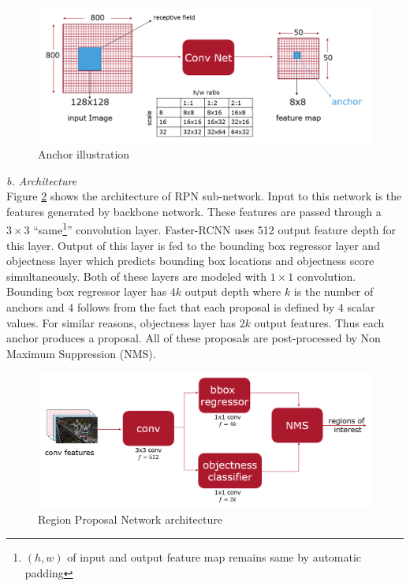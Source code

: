 \begin{figure}
    \centering
    \includegraphics[width=\linewidth]{images/anchors.PNG}
    \caption[Anchor illustration]{Anchor illustration}
    \label{fig:anchors}
\end{figure}

\vspace{5pt}
\textit{b. Architecture}\\
Figure \ref{fig:RPN-architecture} shows the architecture of RPN sub-network. Input to this network is the features generated by backbone network. These features are passed through a $3\times3$ ``same\footnote{$(h,w)$ of input and output feature map remains same by automatic padding}'' convolution layer. Faster-RCNN uses 512 output feature depth for this layer. Output of this layer is fed to the bounding box regressor layer and objectness layer which predicts bounding box locations and objectness score simultaneously.
Both of these layers are modeled with $1\times1$ convolution. Bounding box regressor layer has $4k$ output depth where $k$ is the number of anchors and 4 follows from the fact that each proposal is defined by 4 scalar values. For similar reasons, objectness layer has $2k$ output features. Thus each anchor produces a proposal. All of these proposals are post-processed by Non Maximum Suppression (NMS). 


\begin{figure}
    \centering
    \includegraphics[width=\linewidth]{images/RPN-architecture.PNG}
    \caption[RPN architecture]{Region Proposal Network architecture}
    \label{fig:RPN-architecture}
\end{figure}



